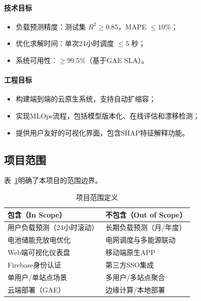 \paragraph{技术目标}
\begin{itemize}
    \item 负载预测精度：测试集 $R^2 \geq 0.85$，MAPE $\leq 10\%$；
    \item 优化求解时间：单次24小时调度 $\leq 5$ 秒；
    \item 系统可用性：$\geq 99.5\%$（基于GAE SLA）。
\end{itemize}

\paragraph{工程目标}
\begin{itemize}
    \item 构建端到端的云原生系统，支持自动扩缩容；
    \item 实现MLOps流程，包括模型版本化、在线评估和漂移检测；
    \item 提供用户友好的可视化界面，包含SHAP特征解释功能。
\end{itemize}

\subsection{项目范围}

表~\ref{tab:project_scope}明确了本项目的范围边界。

\begin{table}[htbp]
    \centering
    \caption{项目范围定义}
    \label{tab:project_scope}
    \begin{tabular}{p{6cm}p{6cm}}
        \toprule
        \textbf{包含（In Scope）} & \textbf{不包含（Out of Scope）} \\
        \midrule
        用户负载预测（24小时滚动）        & 长期负载预测（月/年度）               \\
        电池储能充放电优化             & 电网调度与多能源联动                 \\
        Web端可视化仪表盘            & 移动端原生APP                   \\
        Firebase身份认证          & 第三方SSO集成                   \\
        单用户/单站点场景             & 多用户/多站点聚合                  \\
        云端部署（GAE）             & 边缘计算/本地部署                  \\
        \bottomrule
    \end{tabular}
\end{table}

